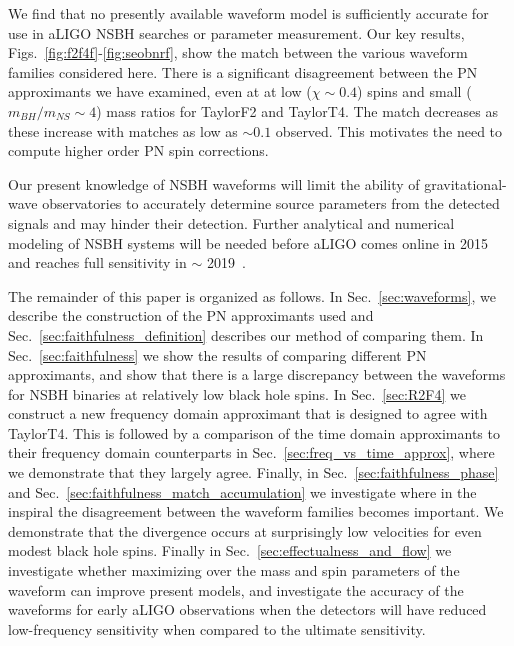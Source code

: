 We find that no presently available waveform model is sufficiently accurate for use
in \ac{aLIGO} \ac{NSBH} searches or parameter measurement. Our key results, Figs.~\ref{fig:f2f4f}-\ref{fig:seobnrf},
show the match between the various waveform families considered here.
There is a significant disagreement between the \ac{PN} approximants we
have examined, even at at low ($\chi \sim 0.4$) spins and small ($m_{BH}/m_{NS} \sim 4$) mass ratios for TaylorF2 and TaylorT4.
The match decreases as these increase with matches as low as $\sim 0.1$ observed. This motivates
the need to compute higher order \ac{PN} spin corrections.  

Our present knowledge of \ac{NSBH} waveforms will limit the
ability of gravitational-wave observatories to accurately determine source
parameters from the detected signals and may hinder their detection.
Further analytical and numerical modeling of \ac{NSBH} systems will be needed
before \ac{aLIGO} comes online in 2015 and reaches full sensitivity in $\sim$
2019~\cite{Aasi:2013wya}.

The remainder of this paper is organized as follows.  In
Sec.~\ref{sec:waveforms}, we describe the construction of the \ac{PN}
approximants used and Sec.~\ref{sec:faithfulness_definition} describes our
method of comparing them.  In Sec.~\ref{sec:faithfulness} we show the results
of comparing different \ac{PN} approximants, and show that there is a large
discrepancy between the waveforms for \ac{NSBH} binaries at relatively low
black hole spins. In Sec.~\ref{sec:R2F4} we construct a new frequency domain
approximant that is designed to agree with TaylorT4. This is followed by a
comparison of the time domain approximants to their frequency domain
counterparts in Sec.~\ref{sec:freq_vs_time_approx}, where we demonstrate that
they largely agree. Finally, in Sec.~\ref{sec:faithfulness_phase} and
Sec.~\ref{sec:faithfulness_match_accumulation} we investigate where in the
inspiral the disagreement between the waveform families becomes important. We
demonstrate that the divergence occurs at surprisingly low velocities for even
modest black hole spins. Finally in Sec.~\ref{sec:effectualness_and_flow} we
investigate whether maximizing over the mass and spin parameters of the
waveform can improve present models, and investigate the accuracy of the
waveforms for early aLIGO observations when the detectors will have reduced
low-frequency sensitivity when compared to the ultimate sensitivity. 



